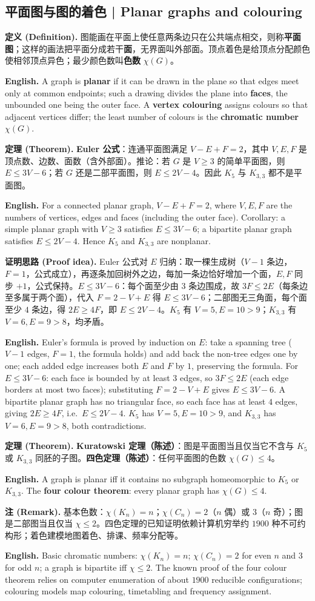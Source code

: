 \documentclass[UTF8,11pt,a4paper]{ctexart}
\newcommand{\EN}[1]{\par\noindent \textbf{English.} #1\par}
\newcommand{\DEF}[2]{\par\noindent\textbf{定义 (Definition).} #1\par\EN{#2}}
\newcommand{\THM}[2]{\par\noindent\textbf{定理 (Theorem).} #1\par\EN{#2}}
\newcommand{\PRF}[2]{\par\noindent\textbf{证明思路 (Proof idea).} #1\par\EN{#2}}
\newcommand{\REM}[2]{\par\noindent\textbf{注 (Remark).} #1\par\EN{#2}}
\begin{document}
\subsection{平面图与图的着色 | Planar graphs and colouring}
\DEF{图能画在平面上使任意两条边只在公共端点相交，则称\textbf{平面图}；这样的画法把平面分成若干\textbf{面}，无界面叫外部面。顶点着色是给顶点分配颜色使相邻顶点异色；最少颜色数叫\textbf{色数} $\chi(G)$。}{A graph is \textbf{planar} if it can be drawn in the plane so that edges meet only at common endpoints; such a drawing divides the plane into \textbf{faces}, the unbounded one being the outer face. A \textbf{vertex colouring} assigns colours so that adjacent vertices differ; the least number of colours is the \textbf{chromatic number} $\chi(G)$.}
\THM{\textbf{Euler 公式}：连通平面图满足 $V-E+F=2$，其中 $V,E,F$ 是顶点数、边数、面数（含外部面）。推论：若 $G$ 是 $V\ge3$ 的简单平面图，则 $E\le3V-6$；若 $G$ 还是二部平面图，则 $E\le2V-4$。因此 $K_5$ 与 $K_{3,3}$ 都不是平面图。}{For a connected planar graph, $V-E+F=2$, where $V,E,F$ are the numbers of vertices, edges and faces (including the outer face). Corollary: a simple planar graph with $V\ge3$ satisfies $E\le3V-6$; a bipartite planar graph satisfies $E\le2V-4$. Hence $K_5$ and $K_{3,3}$ are nonplanar.}
\PRF{Euler 公式对 $E$ 归纳：取一棵生成树（$V-1$ 条边，$F=1$，公式成立），再逐条加回树外之边，每加一条边恰好增加一个面，$E,F$ 同步 $+1$，公式保持。$E\le3V-6$：每个面至少由 $3$ 条边围成，故 $3F\le2E$（每条边至多属于两个面），代入 $F=2-V+E$ 得 $E\le3V-6$；二部图无三角面，每个面至少 $4$ 条边，得 $2E\ge4F$，即 $E\le2V-4$。$K_5$ 有 $V=5,E=10>9$；$K_{3,3}$ 有 $V=6,E=9>8$，均矛盾。}{Euler's formula is proved by induction on $E$: take a spanning tree ($V-1$ edges, $F=1$, the formula holds) and add back the non-tree edges one by one; each added edge increases both $E$ and $F$ by $1$, preserving the formula. For $E\le3V-6$: each face is bounded by at least $3$ edges, so $3F\le2E$ (each edge borders at most two faces); substituting $F=2-V+E$ gives $E\le3V-6$. A bipartite planar graph has no triangular face, so each face has at least $4$ edges, giving $2E\ge4F$, i.e.\ $E\le2V-4$. $K_5$ has $V=5,E=10>9$, and $K_{3,3}$ has $V=6,E=9>8$, both contradictions.}
\THM{\textbf{Kuratowski 定理（陈述）}：图是平面图当且仅当它不含与 $K_5$ 或 $K_{3,3}$ 同胚的子图。\textbf{四色定理（陈述）}：任何平面图的色数 $\chi(G)\le4$。}{A graph is planar iff it contains no subgraph homeomorphic to $K_5$ or $K_{3,3}$. The \textbf{four colour theorem}: every planar graph has $\chi(G)\le4$.}
\REM{基本色数：$\chi(K_n)=n$；$\chi(C_n)=2$（$n$ 偶）或 $3$（$n$ 奇）；图是二部图当且仅当 $\chi\le2$。四色定理的已知证明依赖计算机穷举约 $1900$ 种不可约构形；着色建模地图着色、排课、频率分配等。}{Basic chromatic numbers: $\chi(K_n)=n$; $\chi(C_n)=2$ for even $n$ and $3$ for odd $n$; a graph is bipartite iff $\chi\le2$. The known proof of the four colour theorem relies on computer enumeration of about $1900$ reducible configurations; colouring models map colouring, timetabling and frequency assignment.}
\end{document}
